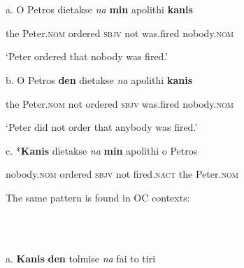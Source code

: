 \documentclass[output=paper]{langsci/langscibook}
\begin{document}
\begin{styleTextkrperxxi}
\ea%
    \label{ex:key:11}
    \gll\\
        \\
    \glt
    \z

          a.  O  Petros     dietakse  \textit{na}   \textbf{min} apolithi     \textbf{kanis}
\end{styleTextkrperxxi}

\begin{styleTextkrperxxi}
    the  Peter.\textsc{nom} ordered  \textsc{sbjv} not   was.fired  nobody.\textsc{nom}
\end{styleTextkrperxxi}

\begin{styleTextkrperxxi}
    ‘Peter ordered that nobody was fired.’
\end{styleTextkrperxxi}

\begin{styleTextkrperxxi}
  b.  O  Petros \textbf{den} dietakse  \textit{na} apolithi   \textbf{kanis}
\end{styleTextkrperxxi}

\begin{styleTextkrperxxi}
    the  Peter.\textsc{nom} not  ordered  \textsc{sbjv}  was.fired  nobody.\textsc{nom}
\end{styleTextkrperxxi}

\begin{styleTextkrperxxi}
    ‘Peter did not order that anybody was fired.’
\end{styleTextkrperxxi}

\begin{styleTextkrperxxi}
  c.    *\textbf{Kanis}  dietakse  \textit{na} \textbf{min} apolithi  o  Petros
\end{styleTextkrperxxi}

\begin{styleTextkrperxxi}
    nobody.\textsc{nom}  ordered  \textsc{sbjv}  not  fired.\textsc{nact}  the    Peter.\textsc{nom}
\end{styleTextkrperxxi}

\begin{styleTextkrperxxi}
The same pattern is found in OC contexts:
\end{styleTextkrperxxi}

\begin{styleTextkrperxxi}
\ea%
    \label{ex:key:12}
    \gll\\
        \\
    \glt
    \z

          a.  \textbf{Kanis}   \textbf{den} tolmise      \textit{na} fai      to    tiri
\end{styleTextkrperxxi}
\end{document}
